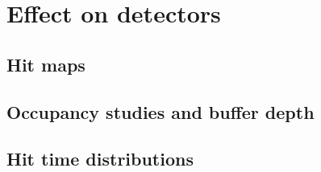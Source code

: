 \chapter{Effect on detectors}
\label{EffectDetectors}
\section{Hit maps}
\label{EffectDetectors:hitmaps}
\section{Occupancy studies and buffer depth}
\label{EffectDetectors:occupancy}
\section{Hit time distributions}
\label{EffectDetectors:hittime}

